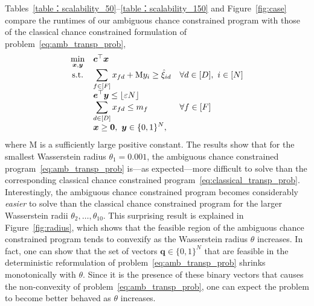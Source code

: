 \documentclass[nonblindrev]{informs2017}
\newcommand{\1}[1]{\mathds{1}{\left(#1\right)}}
\begin{document}
Tables~\ref{table：scalability_50}--\ref{table：scalability_150} and Figure~\ref{fig:case} compare the runtimes of our ambiguous chance constrained program with those of the classical chance constrained formulation of problem~\eqref{eq:amb_transp_prob},
\begin{equation}\label{eq:classical_transp_prob}
\begin{array}{cl@{\quad}l}
\displaystyle \min_{\bm{x}, \bm{y}} & \bm{c}^\top\bm{x} \\
{\rm s.t.} & \displaystyle \sum_{f \in [F]} x_{fd} + \mathrm{M} y_i \geq \hat{\xi}_{id} & \forall d \in [D], ~i \in [N] \\
& \displaystyle \bm{e}^\top \bm{y} \leq \lfloor \varepsilon N \rfloor \\
& \displaystyle \sum_{d \in [D]} x_{fd} \leq m_f & \displaystyle \forall f \in [F] \\
& \displaystyle \bm{x} \geq \bm{0}, ~ \bm{y} \in \{ 0, 1 \}^N,
\end{array}
\end{equation}
where $\mathrm{M}$ is a sufficiently large positive constant. The results show that for the smallest Wasserstein radius $\theta_1 = 0.001$, the ambiguous chance constrained program~\eqref{eq:amb_transp_prob} is---as expected---more difficult to solve than the corresponding classical chance constrained program~\eqref{eq:classical_transp_prob}. Interestingly, the ambiguous chance constrained program becomes considerably \emph{easier} to solve than the classical chance constrained program for the larger Wasserstein radii $\theta_2, \ldots, \theta_{10}$. This surprising result is explained in Figure~\ref{fig:radius}, which shows that the feasible region of the ambiguous chance constrained program tends to convexify as the Wasserstein radius $\theta$ increases. In fact, one can show that the set of vectors $\bm{q} \in \{ 0, 1 \}^N$ that are feasible in the deterministic reformulation of problem~\eqref{eq:amb_transp_prob} shrinks monotonically with $\theta$. Since it is the presence of these binary vectors that causes the non-convexity of problem~\eqref{eq:amb_transp_prob}, one can expect the problem to become better behaved as $\theta$ increases.
\end{document}
